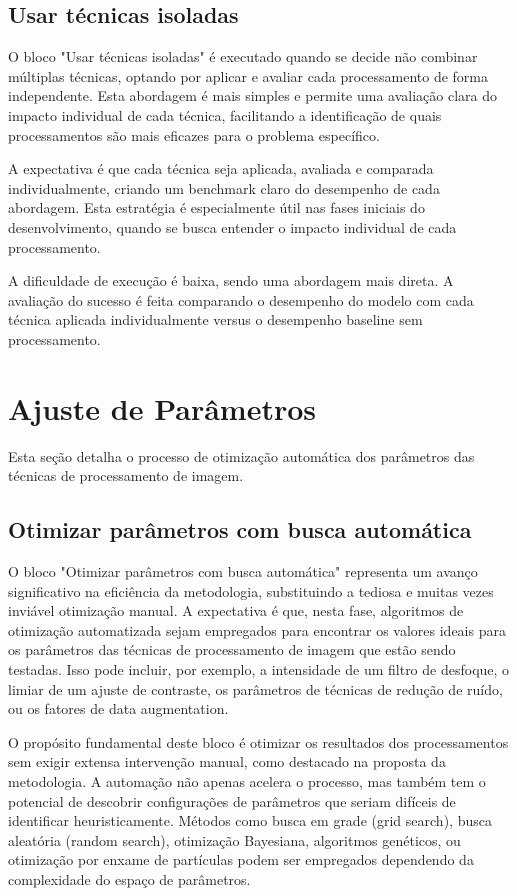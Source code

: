 \subsection{Usar técnicas isoladas}
O bloco "Usar técnicas isoladas" é executado quando se decide não combinar múltiplas técnicas, optando por aplicar e avaliar cada processamento de forma independente. Esta abordagem é mais simples e permite uma avaliação clara do impacto individual de cada técnica, facilitando a identificação de quais processamentos são mais eficazes para o problema específico.

A expectativa é que cada técnica seja aplicada, avaliada e comparada individualmente, criando um benchmark claro do desempenho de cada abordagem. Esta estratégia é especialmente útil nas fases iniciais do desenvolvimento, quando se busca entender o impacto individual de cada processamento.

A dificuldade de execução é baixa, sendo uma abordagem mais direta. A avaliação do sucesso é feita comparando o desempenho do modelo com cada técnica aplicada individualmente versus o desempenho baseline sem processamento.

\section{Ajuste de Parâmetros}

Esta seção detalha o processo de otimização automática dos parâmetros das técnicas de processamento de imagem.

\subsection{Otimizar parâmetros com busca automática}
O bloco "Otimizar parâmetros com busca automática" representa um avanço significativo na eficiência da metodologia, substituindo a tediosa e muitas vezes inviável otimização manual. A expectativa é que, nesta fase, algoritmos de otimização automatizada sejam empregados para encontrar os valores ideais para os parâmetros das técnicas de processamento de imagem que estão sendo testadas. Isso pode incluir, por exemplo, a intensidade de um filtro de desfoque, o limiar de um ajuste de contraste, os parâmetros de técnicas de redução de ruído, ou os fatores de data augmentation.

O propósito fundamental deste bloco é otimizar os resultados dos processamentos sem exigir extensa intervenção manual, como destacado na proposta da metodologia. A automação não apenas acelera o processo, mas também tem o potencial de descobrir configurações de parâmetros que seriam difíceis de identificar heuristicamente. Métodos como busca em grade (grid search), busca aleatória (random search), otimização Bayesiana, algoritmos genéticos, ou otimização por enxame de partículas podem ser empregados dependendo da complexidade do espaço de parâmetros.

